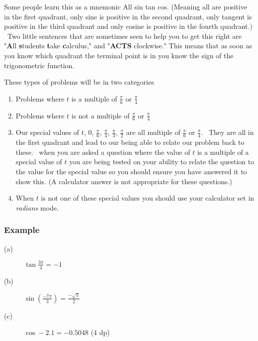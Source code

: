 Some people learn this as a mnemonic All sin tan cos. (Meaning all are positive in the first quadrant, only sine is positive in the second quadrant,
only tangent is positive in the third quadrant and only cosine is positive in the fourth quadrant.) \ Two little
sentences that are sometimes seen to help you to get this right are "\textbf{A}ll \textbf{s}tudents \textbf{t}ake \textbf{c}alculus," and
"\textbf{ACTS} clockwise." This means that as soon as you know which quadrant the terminal point is in you know the sign of the trigonometric function.


These types of problems will be in two categories 


\begin{enumerate}
\item Problems where $t$ is a multiple of $\frac{\pi }{6}$ or $\frac{\pi }{4}$ 

\item Problems where $t$ is not a multiple of $\frac{\pi }{6}$ or $\frac{\pi }{4}$ 

\item Our special values of $t$, $0$, $\frac{\pi }{6}$, $\frac{\pi }{4}$, $\frac{\pi }{3}$, $\frac{\pi }{2}$ are all multiple of $\frac{\pi }{6}$ or $\frac{\pi }{4}$. \ They are all in the first quadrant and lead to our being able to relate our problem back
to these. \ when you are asked a question where the value of $t$ is a multiple of a special value of $t$ you are being tested on your ability to relate the question to the value for the special value so you should ensure you have
answered it to show this. (A calculator answer is not appropriate for these questions.) 

\item When
$t$ is not one of these special values you should use your calculator set in \emph{radians} mode. \end{enumerate}


\subsubsection{Example}
\begin{description}
\item [(a)] $\tan  \frac{3 \pi }{4} = -1$ 

\item [(b)] $\sin  \genfrac{(}{)}{}{}{ -7 \pi }{3} =\frac{ -\sqrt{3}}{2}$ 

\item [(c)] $\cos  -2.1 = -0.5048$ (4 dp) \end{description}



